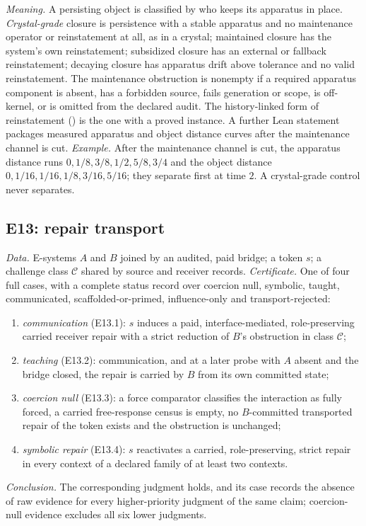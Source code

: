 \emph{Meaning.} A persisting object is classified by who keeps its apparatus in place.
\emph{Crystal-grade} closure is persistence with a stable apparatus and no maintenance operator or
reinstatement at all, as in a crystal; maintained closure has the system's own reinstatement;
subsidized closure has an external or fallback reinstatement; decaying closure has apparatus drift
above tolerance and no valid reinstatement. The maintenance obstruction is nonempty if a required
apparatus component is absent, has a forbidden source, fails generation or scope, is off-kernel, or
is omitted from the declared audit. The history-linked form of reinstatement
() is the one with a proved instance. A further Lean statement packages
measured apparatus and object distance curves after the maintenance channel is cut.
\emph{Example.} After the maintenance channel is cut, the apparatus distance runs
$0, 1/8, 3/8, 1/2, 5/8, 3/4$ and the object distance $0, 1/16, 1/16, 1/8, 3/16, 5/16$; they separate
first at time $2$. A crystal-grade control never separates.

\subsection{E13: repair transport}\label{sec:tmpl-e13}

\begin{schema}\label{tmpl:e13}
\emph{Data.} E-systems $A$ and $B$ joined by an audited, paid bridge; a token $s$; a challenge class
$\mathcal C$ shared by source and receiver records.
\emph{Certificate.} One of four full cases, with a complete status record over coercion null,
symbolic, taught, communicated, scaffolded-or-primed, influence-only and transport-rejected:
\begin{enumerate}
  \item \emph{communication} (E13.1): $s$ induces a paid, interface-mediated, role-preserving
    carried receiver repair with a strict reduction of $B$'s obstruction in class $\mathcal C$;
  \item \emph{teaching} (E13.2): communication, and at a later probe with $A$ absent and the bridge
    closed, the repair is carried by $B$ from its own committed state;
  \item \emph{coercion null} (E13.3): a force comparator classifies the interaction as fully forced,
    a carried free-response census is empty, no $B$-committed transported repair of the token exists
    and the obstruction is unchanged;
  \item \emph{symbolic repair} (E13.4): $s$ reactivates a carried, role-preserving, strict repair in
    every context of a declared family of at least two contexts.
\end{enumerate}
\emph{Conclusion.} The corresponding judgment holds, and its case records the absence of raw evidence
for every higher-priority judgment of the same claim; coercion-null evidence excludes all six lower
judgments.
\end{schema}

